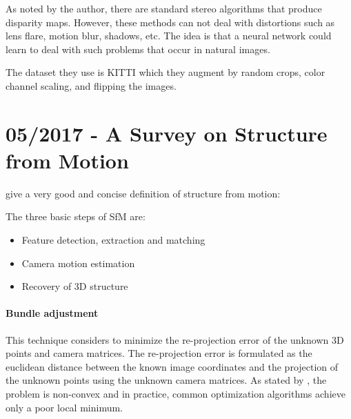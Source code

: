 		As noted by the author, there are standard stereo algorithms that produce disparity maps.
		However, these methods can not deal with distortions such as lens flare, motion blur, shadows, etc.
		The idea is that a neural network could learn to deal with such problems that occur in natural images.
		
		The dataset they use is {KITTI} \cite{Geiger2012KITTI} which they augment by random crops, color channel scaling, and flipping the images.
		
	\section{05/2017 - A Survey on Structure from Motion}
	
		\cite{survey2017} give a very good and concise definition of structure from motion:
		
		
		The three basic steps of SfM are:
		\begin{itemize}
			\item Feature detection, extraction and matching
			\item Camera motion estimation
			\item Recovery of 3D structure
		\end{itemize}
		
		\paragraph{Bundle adjustment} 
			This technique considers to minimize the re-projection error of the unknown 3D points and camera matrices.
			The re-projection error is formulated as the euclidean distance between the known image coordinates and the projection of the unknown points using the unknown camera matrices.
			As stated by \cite{survey2017}, the problem is non-convex and in practice, common optimization algorithms achieve only a poor local minimum.
			
